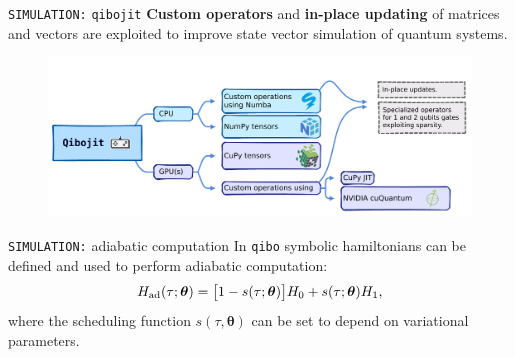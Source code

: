 \documentclass[20pt, final]{beamer}
\newlength{\colwidth}
\begin{document}
\begin{frame}[t]
\begin{columns}[t]
\begin{column}{\colwidth}
\begin{block}{\texttt{SIMULATION:} \texttt{qibojit}}
  \textbf{Custom operators} and \textbf{in-place updating} of matrices and vectors are exploited 
  to improve state vector simulation of quantum systems.
  \begin{figure}
    \includegraphics[width=0.88  \textwidth]{figures/qibojit.pdf}
  \end{figure}

  \end{block}

  \begin{block}{\texttt{SIMULATION:} adiabatic computation}
  In \texttt{qibo} symbolic hamiltonians can be defined and used to perform 
  adiabatic computation:
  \begin{equation}
  H_{\rm ad}(\tau; \bm{\theta}) = \bigl[ 1 - s(\tau; \bm{\theta}) \bigr] H_0 +  
  s(\tau; \bm{\theta}) H_1,
  \end{equation}
  where the scheduling function $s(\tau, \bm{\theta})$ can be set to depend on 
  variational parameters.



  
 
  



\end{block}
\end{column}
\end{columns}
\end{frame}
\end{document}
